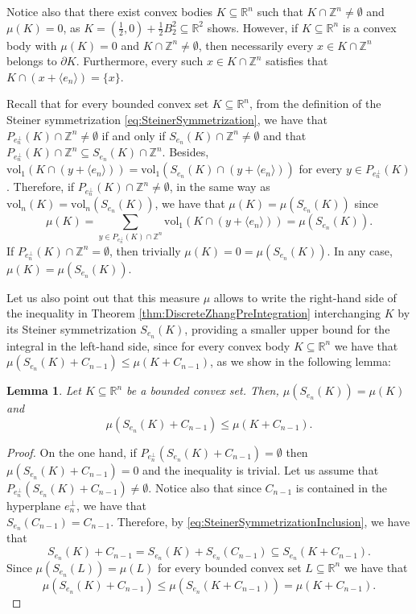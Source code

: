 \documentclass[10pt]{amsart}
\newtheorem{lemma}[thm]{Lemma}
\def\R{\mathbb{R}}
\def\Z{\mathbb{Z}}
\def\vol{\mathrm{vol}}
\numberwithin{equation}{section}
\begin{document}
Notice also that there exist convex bodies $K\subseteq\R^n$ such that $K\cap\Z^n\neq\emptyset$ and $\mu(K)=0$, as $K=\left(\frac{1}{2},0\right)+\frac{1}{2}B_2^2\subseteq\R^2$ shows. However, if $K\subseteq\R^n$ is a convex body with $\mu(K)=0$ and $K\cap\Z^n\neq\emptyset$, then necessarily every $x\in K\cap\Z^n$ belongs to $\partial K$. Furthermore, every such $x\in K\cap\Z^n$ satisfies that $K\cap(x+\langle e_n\rangle)=\{x\}$.

Recall that for every bounded convex set $K\subseteq\R^n$, from the definition of the Steiner symmetrization \eqref{eq:SteinerSymmetrization}, we have that $P_{e_n^\perp}(K)\cap\Z^n\neq\emptyset$ if and only if $S_{e_n}(K)\cap\Z^n\neq\emptyset$ and that $P_{e_n^\perp}(K)\cap\Z^n\subseteq S_{e_n}(K)\cap\Z^n$. Besides, $\vol_1(K\cap(y+\langle e_n\rangle))=\vol_1(S_{e_n}(K)\cap(y+\langle e_n\rangle))$ for every $y\in P_{e_n^\perp}(K)$. Therefore, if $P_{e_n^\perp}(K)\cap\Z^n\neq\emptyset$, in the same way as $\vol_n(K)=\vol_n(S_{e_n}(K))$, we have that $\mu(K)=\mu(S_{e_n}(K))$ since
$$
\mu(K)=\sum_{y\in P_{e_n^\perp}(K)\cap\Z^n}\vol_1(K\cap(y+\langle e_n\rangle))=\mu(S_{e_n}(K)).
$$
If $P_{e_n^\perp}(K)\cap\Z^n=\emptyset$, then trivially $\mu(K)=0=\mu(S_{e_n}(K))$. In any case, $\mu(K)=\mu(S_{e_n}(K))$.

Let us also point out that this measure $\mu$ allows to write the right-hand side of the inequality in Theorem \ref{thm:DiscreteZhangPreIntegration} interchanging $K$ by its Steiner symmetrization $S_{e_n}(K)$, providing a smaller upper bound for the integral in the left-hand side, since for every convex body $K\subseteq\R^n$ we have that $\mu(S_{e_n}(K)+C_{n-1})\leq\mu(K+C_{n-1})$, as we show in the following lemma:
\begin{lemma}\label{lem:MuSteiner}
Let $K\subseteq\R^n$ be a bounded convex set. Then, $\mu(S_{e_n}(K))=\mu(K)$ and
$$
\mu(S_{e_n}(K)+C_{n-1})\leq\mu(K+C_{n-1}).
$$
\end{lemma}

\begin{proof}
On the one hand, if $P_{e_n^\perp}(S_{e_n}(K)+C_{n-1})=\emptyset$ then $\mu(S_{e_n}(K)+C_{n-1})=0$ and the inequality is trivial. Let us assume that $P_{e_n^\perp}(S_{e_n}(K)+C_{n-1})\neq\emptyset$.  Notice also that since $C_{n-1}$ is contained in the hyperplane $e_n^\perp$, we have that \\$S_{e_n}(C_{n-1})=C_{n-1}$. Therefore, by \eqref{eq:SteinerSymmetrizationInclusion}, we have that
$$
S_{e_n}(K)+C_{n-1}=S_{e_n}(K)+S_{e_n}(C_{n-1})\subseteq S_{e_n}(K+C_{n-1}).
$$
Since $\mu(S_{e_n}(L))=\mu(L)$ for every bounded convex set $L\subseteq\R^n$ we have that
$$
\mu(S_{e_n}(K)+C_{n-1})\leq\mu(S_{e_n}(K+C_{n-1}))=\mu(K+C_{n-1}).
$$
\end{proof}
\end{document}
